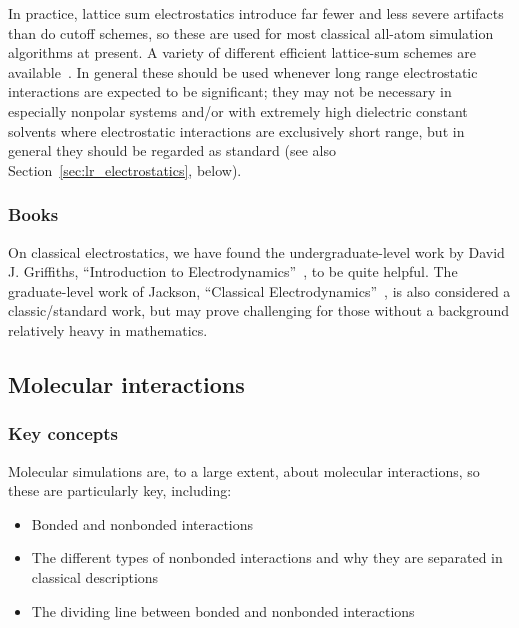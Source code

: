 \documentclass[9pt,bestpractices]{livecoms}
\begin{document}
In practice, lattice sum electrostatics introduce far fewer and less severe artifacts than do cutoff schemes, so these are used for most classical all-atom simulation algorithms at present. 
A variety of different efficient lattice-sum schemes are available~\cite{Cisneros:2014:ChemRev}.
In general these should be used whenever long range electrostatic interactions are expected to be significant; they may not be necessary in especially nonpolar systems and/or with extremely high dielectric constant solvents where electrostatic interactions are exclusively short range, but in general they should be regarded as standard (see also Section~\ref{sec:lr_electrostatics}, below). 



\subsubsection{Books}

On classical electrostatics, we have found the undergraduate-level work by David J. Griffiths, ``Introduction to Electrodynamics''~\cite{Griffiths:2017:}, to be quite helpful.
The graduate-level work of Jackson, ``Classical Electrodynamics''~\cite{Jackson:1998:}, is also considered a classic/standard work, but may prove challenging for those without a background relatively heavy in mathematics.


\subsection{Molecular interactions}
\label{sec:mol_interactions}
\subsubsection{Key concepts}
Molecular simulations are, to a large extent, about molecular interactions, so these are particularly key, including:
\begin{itemize}
\item Bonded and nonbonded interactions
\item The different types of nonbonded interactions and why they are separated in classical descriptions
\item The dividing line between bonded and nonbonded interactions
\end{itemize}
\end{document}
